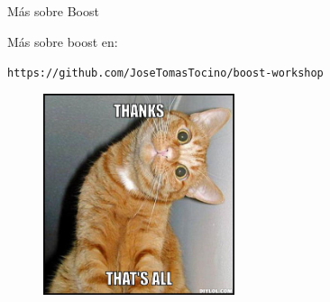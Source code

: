 \documentclass[8pt,xcolor=svgnames]{beamer}
\begin{document}
\begin{frame}{Más sobre Boost}

\centering

\Huge

Más sobre boost en:

\large

\texttt{https://github.com/JoseTomasTocino/boost-workshop}
  
\end{frame}

\begin{frame}{}
  \begin{figure}[c!]
    \centering
    \includegraphics[width=0.5\textwidth]{img_cat_bye.jpg}
  \end{figure}
\end{frame}



\end{document}
